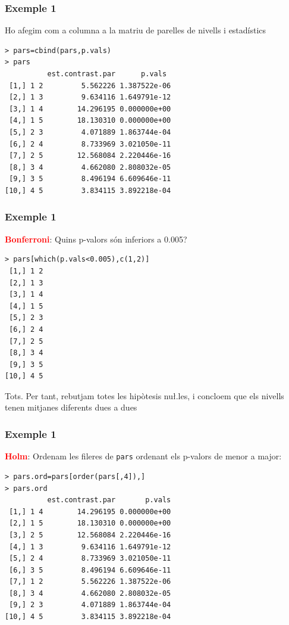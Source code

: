 \documentclass[12pt,t]{beamer}
\newcommand{\red}[1]{\textcolor{red}{#1}}
\theoremstyle{plain}
\theoremstyle{definition}
\begin{document}
\begin{frame}[fragile]
\frametitle{Exemple 1}
\vspace*{-2ex}

Ho afegim com a columna a la matriu de parelles de nivells i estadístics
\begin{verbatim}
> pars=cbind(pars,p.vals)
> pars
          est.contrast.par      p.vals
 [1,] 1 2         5.562226 1.387522e-06
 [2,] 1 3         9.634116 1.649791e-12
 [3,] 1 4        14.296195 0.000000e+00
 [4,] 1 5        18.130310 0.000000e+00
 [5,] 2 3         4.071889 1.863744e-04
 [6,] 2 4         8.733969 3.021050e-11
 [7,] 2 5        12.568084 2.220446e-16
 [8,] 3 4         4.662080 2.808032e-05
 [9,] 3 5         8.496194 6.609646e-11
[10,] 4 5         3.834115 3.892218e-04
\end{verbatim}

\end{frame}
\begin{frame}[fragile]
\frametitle{Exemple 1}
\vspace*{-2ex}

\red{\bf Bonferroni}: Quins p-valors són inferiors a 0.005?
{\small \begin{verbatim}
> pars[which(p.vals<0.005),c(1,2)]        
 [1,] 1 2
 [2,] 1 3
 [3,] 1 4
 [4,] 1 5
 [5,] 2 3
 [6,] 2 4
 [7,] 2 5
 [8,] 3 4
 [9,] 3 5
[10,] 4 5
\end{verbatim}
}

Tots. Per tant, rebutjam totes les hipòtesis nu\l.les, i concloem que els nivells tenen mitjanes diferents dues a dues

\end{frame}

\begin{frame}[fragile]
\frametitle{Exemple 1}
\vspace*{-2ex}

\red{\bf Holm}: Ordenam les fileres de \texttt{pars} ordenant els p-valors de menor a major:
{\small 
\begin{verbatim}
> pars.ord=pars[order(pars[,4]),]
> pars.ord
          est.contrast.par       p.vals
 [1,] 1 4        14.296195 0.000000e+00
 [2,] 1 5        18.130310 0.000000e+00
 [3,] 2 5        12.568084 2.220446e-16
 [4,] 1 3         9.634116 1.649791e-12
 [5,] 2 4         8.733969 3.021050e-11
 [6,] 3 5         8.496194 6.609646e-11
 [7,] 1 2         5.562226 1.387522e-06
 [8,] 3 4         4.662080 2.808032e-05
 [9,] 2 3         4.071889 1.863744e-04
[10,] 4 5         3.834115 3.892218e-04
\end{verbatim}
}
\end{frame}
\end{document}
